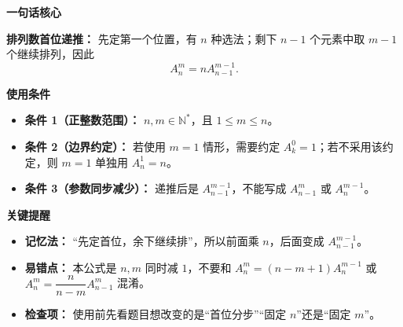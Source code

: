 \begin{summarybox}
\textbf{\textcolor{CSummary}{一句话核心}}

\textbf{排列数首位递推：} 先定第一个位置，有 $n$ 种选法；剩下 $n-1$ 个元素中取 $m-1$ 个继续排列，因此
\[
A_n^m=nA_{n-1}^{m-1}.
\]

\medskip
\textbf{\textcolor{CSummary}{使用条件}}
\begin{itemize}[leftmargin=*, itemsep=0.5em, topsep=0.4em]
    \item \textbf{条件 1（正整数范围）：} $n,m\in\mathbb{N}^*$，且 $1\leq m\leq n$。
    \item \textbf{条件 2（边界约定）：} 若使用 $m=1$ 情形，需要约定 $A_k^0=1$；若不采用该约定，则 $m=1$ 单独用 $A_n^1=n$。
    \item \textbf{条件 3（参数同步减少）：} 递推后是 $A_{n-1}^{m-1}$，不能写成 $A_{n-1}^{m}$ 或 $A_n^{m-1}$。
\end{itemize}

\medskip
\textbf{\textcolor{CSummary}{关键提醒}}
\begin{itemize}[leftmargin=*, itemsep=0.5em, topsep=0.4em]
    \item \textbf{记忆法：} “先定首位，余下继续排”，所以前面乘 $n$，后面变成 $A_{n-1}^{m-1}$。
    \item \textbf{易错点：} 本公式是 $n,m$ 同时减 $1$，不要和 $A_n^m=(n-m+1)A_n^{m-1}$ 或 $A_n^m=\dfrac{n}{n-m}A_{n-1}^{m}$ 混淆。
    \item \textbf{检查项：} 使用前先看题目想改变的是“首位分步”“固定 $n$”还是“固定 $m$”。
\end{itemize}
\end{summarybox}

